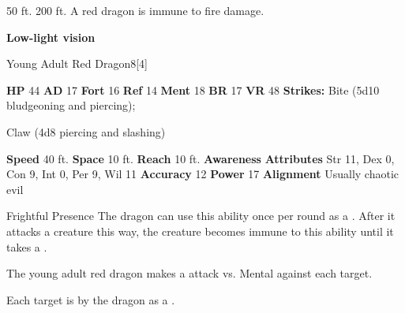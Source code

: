       
       50 ft.
     200 ft.
     A red dragon is immune to fire damage.
    \par\noindent\textbf{Low-light vision}
  

  \begin{monsubsection}{Young Adult Red Dragon}{8}[4]
    \vspace{-1em}\vspace{-1em}
    \vspace{0em}

    
    

    \begin{spellcontent}
      \begin{spelltargetinginfo}
        \pari \textbf{HP} 44 \monsep
          \textbf{AD} 17 \monsep
          \textbf{Fort} 16 \monsep
          \textbf{Ref} 14 \monsep
          \textbf{Ment} 18
        \pari \textbf{BR} 17 \monsep
        \textbf{VR} 48
        \pari \textbf{Strikes:}
            Bite  (5d10 bludgeoning and piercing);
\par Claw  (4d8 piercing and slashing)
      \end{spelltargetinginfo}
    \end{spellcontent}
    \begin{monsterfooter}
      \pari \textbf{Speed} 40 ft. \monsep
        \textbf{Space} 10 ft. \monsep
        \textbf{Reach} 10 ft.
      \pari \textbf{Awareness} 
      \pari \textbf{Attributes}
        Str 11, Dex 0,
        Con 9, Int 0,
        Per 9, Wil 11
      \pari \textbf{Accuracy} 12 \monsep
        \textbf{Power} 17
      \pari \textbf{Alignment} Usually chaotic evil
    \end{monsterfooter}
  \end{monsubsection}
  \begin{freeability}{Frightful Presence}
      The dragon can use this ability once per round as a .
      After it attacks a creature this way, the creature becomes immune to this ability until it takes a .
      \par The young adult red dragon makes a  attack
        vs. Mental against each target.
    
    \hit Each target is  by the dragon as a .
    \end{freeability}
  

